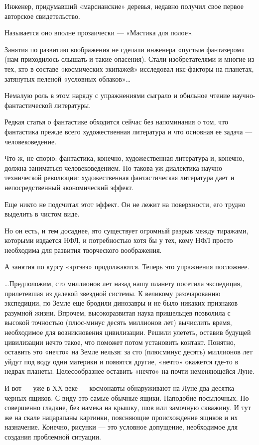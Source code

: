 Инженер, придумавший «марсианские»  деревья, недавно  получил свое  первое
авторское свидетельство.

Называется оно вполне прозаически — «Мастика для полое».

Занятия по развитию  воображения не сделали  инженера «пустым  фантазером»
(нам приходилось слышать и такие опасения). Стали изобретателями и  многие
из тех, кто  в составе  «космических экипажей»  исследовал икс-факторы  на
планетах, затянутых пеленой «условных облаков»…

Немалую роль  в  этом наряду  с  упражнениями сыграло  и  обильное  чтение
научно-фантастической литературы.

Редкая статья о  фантастике обходится  сейчас без напоминания  о том,  что
фантастика прежде всего художественная литература и что основная ее задача
— человековедение.

Что  ж,  не  спорю:  фантастика,  конечно,  художественная  литература  и,
конечно, должна  заниматься  человековедением.  Но  такова  уж  диалектика
научно-технической  революции:  художественная  фантастическая  литература
дает и непосредственный экономический эффект.

Еще никто не подсчитал этот эффект. Он не лежит на поверхности, его трудно
выделить в чистом виде.

Но он есть, и тем досаднее, ято существует огромный разрыв между тиражами,
которыми издается  НФЛ, и  потребностью хотя  бы у  тех, кому  НФЛ  просто
необходима для развития творческого воображения.

А занятия по курсу «эртэвэ» продолжаются. Теперь это упражнения посложнее.

…Предположим, сто миллионов  лет назад нашу  планету посетила  экспедиция,
прилетевшая  из  далекой  звездной   системы.  К  великому   разочарованию
экспедиции, по Земле  еще бродили  динозавры и не  было никаких  признаков
разумной жизни.  Впрочем,  высокоразвитая  наука  пришельцев  позволила  с
высокой точностью  (плюс-минус  десять  миллионов  лет)  вычислить  время,
необходимое для возникновения цивилизации. Решили улететь, оставив будущей
цивилизации нечто такое,  что поможет потом  установить контакт.  Понятно,
оставить это «нечто» на Земле нельзя: за сто (плюсминус десять)  миллионов
лет уйдут  под воду  одни  материки и  появятся другие,  «нечто»  окажется
где-то  в  недрах  планеты.  Целесообразнее  оставить  «нечто»  на   почти
неменяющейся Луне.

И вот — уже в XX веке — космонавты обнаруживают на Луне два десятка черных
ящиков.  С  виду  это  самые  обычные  ящики.  Наподобие  посылочных.   Но
совершенно гладкие, без намека на крышку, шов или замочную скважину. И тут
же на  скале нацарапаны  картинки, поясняющие  происхождение ящиков  и  их
назначение. Конечно,  рисунки —  это условное  допущение, необходимое  для
создания проблемной ситуации.


